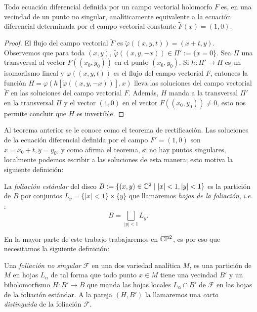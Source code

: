 \begin{Teorema}
\label{Teo:Rectificacion}
Todo ecuación diferencial definida por un campo vectorial holomorfo $F$ es, en una vecindad de un punto no singular, analíticamente equivalente a la ecuación diferencial determinada por el campo vectorial constante $\tilde{F}(x)=(1,0)$.
\end{Teorema}
\begin{proof}
  El flujo del campo vectorial $\tilde{F}$ es $\tilde{\varphi}((x,y,t))=(x+t,y)$. Observemos que para toda $(x,y)$, $\tilde{\varphi}((x,y,-x))\in\Pi':=\{x=0\}$. Sea $\Pi$ una transversal al vector $F((x_{0},y_{0}))$ en el punto $(x_{0},y_{0})$. Si $h\colon\Pi'\rightarrow\Pi$ es un isomorfismo lineal y $\varphi((x,y,t))$ es el flujo del campo vectorial $F$, entonces la función $H=\varphi(h[\tilde{\varphi}((x,y,-x))],x)$ lleva las soluciones del campo vectorial $\tilde{F}$ en las soluciones del campo vectorial $F$. Además, $H$ manda a la transversal $\Pi'$ en la transversal $\Pi$ y el vector $(1,0)$ en el vector $F((x_{0},y_{0}))\neq 0$, esto nos permite concluir que $H$ es invertible.   
\end{proof}
Al teorema anterior se le conoce como el teorema de rectificación. Las soluciones de la ecuación diferencial definida por el campo $F'=(1,0)$ son $x=x_{0}+t,y=y_{0}$, y como afirma el teorema, si no hay puntos singulares, localmente podemos escribir a las soluciones de esta manera; esto motiva la siguiente definición:

\begin{defn}
\label{Def:FoliacionEstandar}
La \emph{foliación estándar} del disco $B:=\{(x,y)\in\mathbb{C}^{2} \mid \left|x\right|<1, \left|y\right|<1 \}$ es la partición de $B$ por conjuntos $L_{y}=\{ \left|x\right|<1 \}\times\{y \} $ que llamaremos \emph{hojas de la foliación}, $\mathit{i.e.}$:
\begin{equation}
B=\bigsqcup_{\left|y\right|<1}L_{y}.
\end{equation}
\end{defn}

En la mayor parte de este trabajo trabajaremos en $\mathbb{C}\mathbb{P}^2$, es por eso que necesitamos la siguiente definición:

\begin{defn}
\label{Def:FoliacionNoSingular}
Una \emph{foliación no singular} $\mathcal{F}$ en una dos variedad analítica $M$, es una partición de $M$ en hojas $L_{\alpha}$ de tal forma que todo punto $x\in M$ tiene una vecindad $B'$ y un biholomorfismo $H\colon B'\rightarrow B $ que manda las hojas locales $L_{\alpha}\cap B'$ de $\mathcal{F}$ en las hojas de la foliación estándar. A la pareja $(H,B')$ la llamaremos una \emph{carta distinguida} de la foliación $\mathcal{F}$.
\end{defn}

